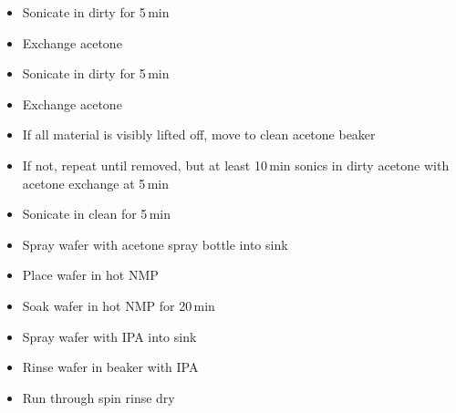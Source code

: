 \begin{itemize}
\begin{itemize}
\item Sonicate in dirty for 5\,min
\item Exchange acetone
\item Sonicate in dirty for 5\,min
\item Exchange acetone
\item If all material is visibly lifted off, move to clean acetone beaker
\item If not, repeat until removed, but at least 10\,min sonics in dirty acetone with acetone exchange at 5\,min
\item Sonicate in clean for 5\,min
\item Spray wafer with acetone spray bottle into sink
\item Place wafer in hot NMP
\item Soak wafer in hot NMP for 20\,min
\item Spray wafer with IPA into sink
\item Rinse wafer in beaker with IPA
\item Run through spin rinse dry
\end{itemize}
\end{itemize}
